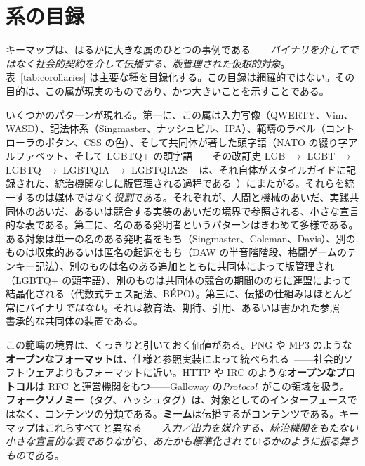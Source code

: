 \documentclass[10pt,letterpaper,twocolumn]{article}
\begin{document}
\section{系の目録}
\label{sec:corollaries}

キーマップは、はるかに大きな属のひとつの事例である——\emph{バイナリを介してではなく社会的契約を介して伝播する、版管理された仮想的対象}。表~\ref{tab:corollaries} は主要な種を目録化する。この目録は網羅的ではない。その目的は、この属が現実のものであり、かつ大きいことを示すことである。

いくつかのパターンが現れる。第一に、この属は入力写像（QWERTY、Vim、WASD）、記法体系（Singmaster、ナッシュビル、IPA）、範疇のラベル（コントローラのボタン、CSS の色）、そして共同体が著した頭字語（NATO の綴り字アルファベット、そして LGBTQ+ の頭字語——その改訂史 LGB $\rightarrow$ LGBT $\rightarrow$ LGBTQ $\rightarrow$ LGBTQIA $\rightarrow$ LGBTQIA2S+ は、それ自体がスタイルガイドに記録された、統治機関なしに版管理される過程である~\citep{glaad_reference_guide}）にまたがる。それらを統一するのは媒体ではなく\emph{役割}である。それぞれが、人間と機械のあいだ、実践共同体のあいだ、あるいは競合する実装のあいだの境界で参照される、小さな宣言的な表である。第二に、名のある発明者というパターンはきわめて多様である。ある対象は単一の名のある発明者をもち（Singmaster、Coleman、Davis）、別のものは収束的あるいは匿名の起源をもち（DAW の半音階階段、格闘ゲームのテンキー記法）、別のものは名のある追加とともに共同体によって版管理され（LGBTQ+ の頭字語）、別のものは共同体の競合の期間ののちに連盟によって結晶化される（代数式チェス記法、BÉPO）。第三に、伝播の仕組みはほとんど常にバイナリ\emph{ではない}。それは教育法、期待、引用、あるいは書かれた参照——書承的な共同体の装置である。

この範疇の境界は、くっきりと引いておく価値がある。PNG や MP3 のような\textbf{オープンなフォーマット}は、仕様と参照実装によって統べられる~\citep{sterne2012mp3}——社会的ソフトウェアよりもフォーマットに近い。HTTP や IRC のような\textbf{オープンなプロトコル}は RFC と運営機関をもつ——Galloway の\emph{Protocol}~\citep{galloway2004protocol}がこの領域を扱う。\textbf{フォークソノミー}（タグ、ハッシュタグ）は、対象としてのインターフェースではなく、コンテンツの分類である。\textbf{ミーム}は伝播するがコンテンツである。キーマップはこれらすべてと異なる——\emph{入力／出力を媒介する、統治機関をもたない小さな宣言的な表でありながら、あたかも標準化されているかのように振る舞うもの}である。
\end{document}

